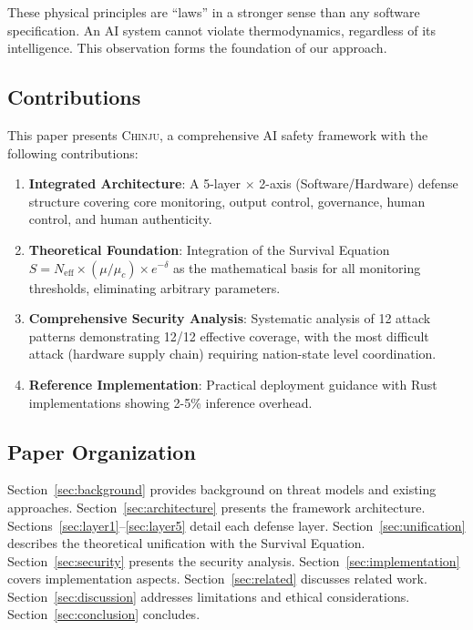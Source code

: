 \documentclass[11pt,a4paper]{article}
\newcommand{\chinju}{\textsc{Chinju}}
\newcommand{\Neff}{N_{\text{eff}}}
\newcommand{\muc}{\mu_c}
\begin{document}
These physical principles are ``laws'' in a stronger sense than any software specification.
An AI system cannot violate thermodynamics, regardless of its intelligence.
This observation forms the foundation of our approach.

\subsection{Contributions}

This paper presents \chinju{}, a comprehensive AI safety framework with the following contributions:

\begin{enumerate}
    \item \textbf{Integrated Architecture}: A 5-layer $\times$ 2-axis (Software/Hardware) defense structure covering core monitoring, output control, governance, human control, and human authenticity.

    \item \textbf{Theoretical Foundation}: Integration of the Survival Equation $S = \Neff \times (\mu/\muc) \times e^{-\delta}$ as the mathematical basis for all monitoring thresholds, eliminating arbitrary parameters.

    \item \textbf{Comprehensive Security Analysis}: Systematic analysis of 12 attack patterns demonstrating 12/12 effective coverage, with the most difficult attack (hardware supply chain) requiring nation-state level coordination.

    \item \textbf{Reference Implementation}: Practical deployment guidance with Rust implementations showing 2-5\% inference overhead.
\end{enumerate}

\subsection{Paper Organization}

Section~\ref{sec:background} provides background on threat models and existing approaches.
Section~\ref{sec:architecture} presents the framework architecture.
Sections~\ref{sec:layer1}--\ref{sec:layer5} detail each defense layer.
Section~\ref{sec:unification} describes the theoretical unification with the Survival Equation.
Section~\ref{sec:security} presents the security analysis.
Section~\ref{sec:implementation} covers implementation aspects.
Section~\ref{sec:related} discusses related work.
Section~\ref{sec:discussion} addresses limitations and ethical considerations.
Section~\ref{sec:conclusion} concludes.
\end{document}
